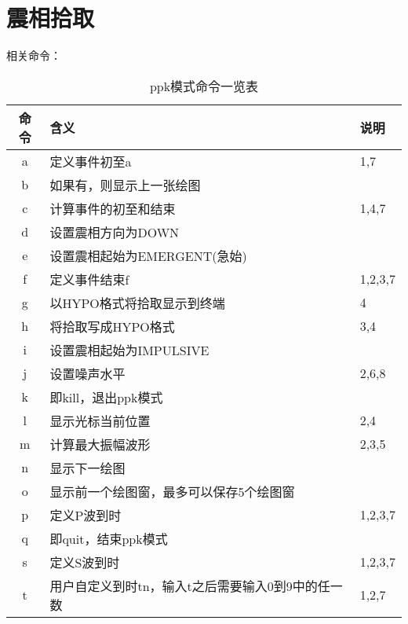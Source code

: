 \section{震相拾取}
\label{sec:phase-picking}

相关命令：

\begin{table}[H]
\centering
\small
\ttfamily
\caption{ppk模式命令一览表}
\label{table:plotpk-commands}
\begin{tabular}{cll}
	\toprule
    命令	&	含义	                                &   说明    \\
	\midrule
    a	    &	定义事件初至a                           &   1,7	    \\
    b	    &	如果有，则显示上一张绘图	            &           \\
    c	    &	计算事件的初至和结束                    &   1,4,7	\\
    d	    &	设置震相方向为DOWN	                    &           \\
    e     	&	设置震相起始为EMERGENT(急始)	        &           \\
    f	    &	定义事件结束f                           &  1,2,3,7	\\
    g	    &	以HYPO格式将拾取显示到终端              &   4   	\\
    h   	&	将拾取写成HYPO格式                      &   3,4 	\\
    i	    &	设置震相起始为IMPULSIVE	                &           \\
    j	    &	设置噪声水平                            &   2,6,8	\\
    k       &   即kill，退出ppk模式                     &           \\
    l	    &	显示光标当前位置                        &   2,4	    \\
    m	    &	计算最大振幅波形                        &   2,3,5	\\
    n	    &	显示下一绘图	                        &           \\
    o	    &	显示前一个绘图窗，最多可以保存5个绘图窗	&           \\
    p	    &	定义P波到时                             &   1,2,3,7	\\
    q	    &	即quit，结束ppk模式	                            &           \\
    s	    &	定义S波到时                             &   1,2,3,7 \\
    t	    &	用户自定义到时tn，输入t之后需要输入0到9中的任一数	&   1,2,7\\

\end{tabular}
\end{table}
